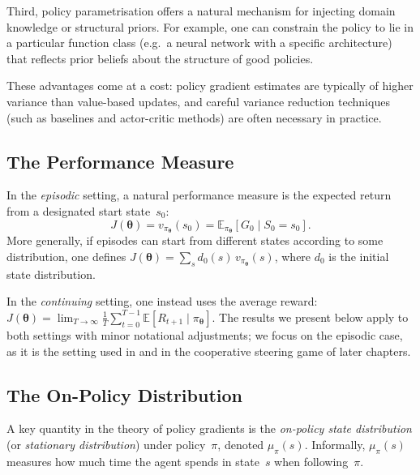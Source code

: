 \documentclass[a4paper,oneside,11pt]{report}
\begin{document}
Third, policy parametrisation offers a natural mechanism for injecting domain knowledge or structural priors. For example, one can constrain the policy to lie in a particular function class (e.g.\ a neural network with a specific architecture) that reflects prior beliefs about the structure of good policies.

These advantages come at a cost: policy gradient estimates are typically of higher variance than value-based updates, and careful variance reduction techniques (such as baselines and actor-critic methods) are often necessary in practice.

\subsection{The Performance Measure}
\label{subsec:performance-measure}

In the \emph{episodic} setting, a natural performance measure is the expected return from a designated start state~$s_0$:
\begin{equation}\label{eq:performance-episodic}
  J(\bm{\theta}) = v_{\pi_{\bm{\theta}}}(s_0) = \mathbb{E}_{\pi_{\bm{\theta}}}\!\left[G_0 \mid S_0 = s_0\right].
\end{equation}
More generally, if episodes can start from different states according to some distribution, one defines $J(\bm{\theta}) = \sum_s d_0(s)\, v_{\pi_{\bm{\theta}}}(s)$, where $d_0$ is the initial state distribution.

In the \emph{continuing} setting, one instead uses the average reward: $J(\bm{\theta}) = \lim_{T\to\infty}\frac{1}{T}\sum_{t=0}^{T-1} \mathbb{E}[R_{t+1}\mid \pi_{\bm{\theta}}]$. The results we present below apply to both settings with minor notational adjustments; we focus on the episodic case, as it is the setting used in \cite{kim2021policygradientalgorithmlearning} and in the cooperative steering game of later chapters.

\subsection{The On-Policy Distribution}
\label{subsec:on-policy-dist}

A key quantity in the theory of policy gradients is the \emph{on-policy state distribution} (or \emph{stationary distribution}) under policy~$\pi$, denoted $\mu_\pi(s)$. Informally, $\mu_\pi(s)$ measures how much time the agent spends in state~$s$ when following~$\pi$.
\end{document}
